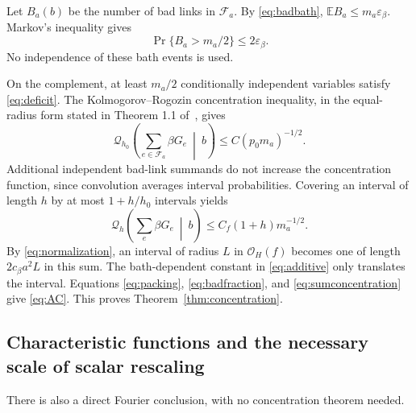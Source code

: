 \documentclass[11pt,letterpaper]{article}
\numberwithin{equation}{section}
\theoremstyle{plain}
\theoremstyle{remark}
\newcommand{\E}{\mathbb E}
\newcommand{\OH}{\mathcal O_H}
\begin{document}
Let $B_a(b)$ be the number of bad links in $\mathcal F_a$. By
\eqref{eq:badbath}, $\E B_a\le m_a\varepsilon_\beta$. Markov's inequality gives
\begin{equation}
 \Pr\{B_a>m_a/2\}\le2\varepsilon_\beta.
 \label{eq:badfraction}
\end{equation}
No independence of these bath events is used.

On the complement, at least $m_a/2$ conditionally independent variables satisfy
\eqref{eq:deficit}. The Kolmogorov--Rogozin concentration inequality, in the
equal-radius form stated in Theorem 1.1 of~\cite{kr}, gives
\[
 \mathcal Q_{h_0}\left(\sum_{e\in\mathcal F_a}\beta G_e\ \middle|\ b\right)
 \le C(p_0m_a)^{-1/2}.
\]
Additional independent bad-link summands do not increase the concentration
function, since convolution averages interval probabilities. Covering an
interval of length $h$ by at most $1+h/h_0$ intervals yields
\begin{equation}
 \mathcal Q_h\left(\sum_e\beta G_e\ \middle|\ b\right)
 \le C_f(1+h)m_a^{-1/2}.
 \label{eq:sumconcentration}
\end{equation}
By \eqref{eq:normalization}, an interval of radius $L$ in $\OH(f)$ becomes one
of length $2c_\beta a^2L$ in this sum. The bath-dependent constant in
\eqref{eq:additive} only translates the interval. Equations
\eqref{eq:packing}, \eqref{eq:badfraction}, and \eqref{eq:sumconcentration}
give \eqref{eq:AC}. This proves Theorem~\ref{thm:concentration}.

\subsection{Characteristic functions and the necessary scale of scalar rescaling}

There is also a direct Fourier conclusion, with no concentration theorem needed.
\end{document}
